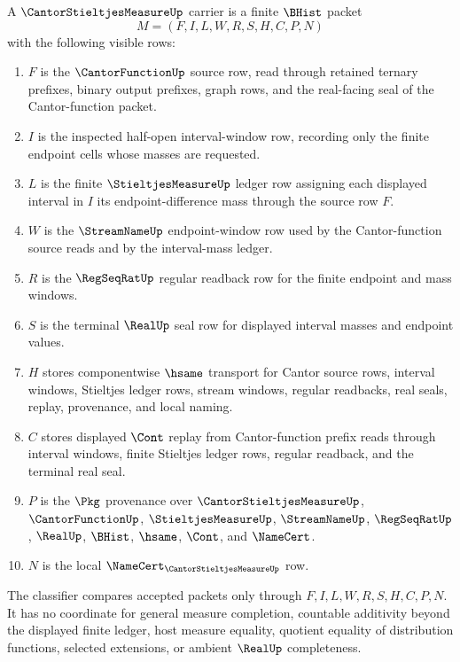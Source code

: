 \begin{definition}
\label{def:cantor-stieltjes-measure-carrier}
A $\CantorStieltjesMeasureUp$ carrier is a finite $\BHist$ packet
$$
M=(F,I,L,W,R,S,H,C,P,N)
$$
with the following visible rows:
\begin{enumerate}
\item $F$ is the $\CantorFunctionUp$ source row, read through retained ternary prefixes, binary output prefixes, graph rows, and the real-facing seal of the Cantor-function packet.
\item $I$ is the inspected half-open interval-window row, recording only the finite endpoint cells whose masses are requested.
\item $L$ is the finite $\StieltjesMeasureUp$ ledger row assigning each displayed interval in $I$ its endpoint-difference mass through the source row $F$.
\item $W$ is the $\StreamNameUp$ endpoint-window row used by the Cantor-function source reads and by the interval-mass ledger.
\item $R$ is the $\RegSeqRatUp$ regular readback row for the finite endpoint and mass windows.
\item $S$ is the terminal $\RealUp$ seal row for displayed interval masses and endpoint values.
\item $H$ stores componentwise $\hsame$ transport for Cantor source rows, interval windows, Stieltjes ledger rows, stream windows, regular readbacks, real seals, replay, provenance, and local naming.
\item $C$ stores displayed $\Cont$ replay from Cantor-function prefix reads through interval windows, finite Stieltjes ledger rows, regular readback, and the terminal real seal.
\item $P$ is the $\Pkg$ provenance over $\CantorStieltjesMeasureUp$, $\CantorFunctionUp$, $\StieltjesMeasureUp$, $\StreamNameUp$, $\RegSeqRatUp$, $\RealUp$, $\BHist$, $\hsame$, $\Cont$, and $\NameCert$.
\item $N$ is the local $\NameCert_{\CantorStieltjesMeasureUp}$ row.
\end{enumerate}
The classifier compares accepted packets only through $F,I,L,W,R,S,H,C,P,N$. It has no coordinate for general measure completion, countable additivity beyond the displayed finite ledger, host measure equality, quotient equality of distribution functions, selected extensions, or ambient $\RealUp$ completeness.
\end{definition}

